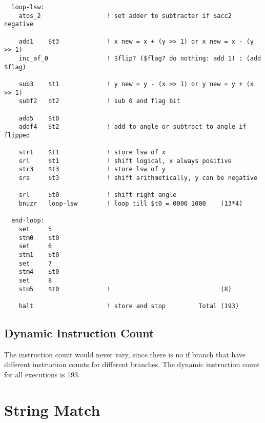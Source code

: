 \documentclass{article}
\begin{document}
\begin{lstlisting}
  loop-lsw:
    atos_2                  ! set adder to subtracter if $acc2 negative

    add1    $t3             ! x new = x + (y >> 1) or x new = x - (y >> 1)
    inc_af_0                ! $flip? ($flag? do nothing: add 1) : (add $flag)

    sub3    $t1             ! y new = y - (x >> 1) or y new = y + (x >> 1)
    subf2   $t2             ! sub 0 and flag bit

    add5    $t0
    addf4   $t2             ! add to angle or subtract to angle if flipped

    str1    $t1             ! store lsw of x
    srl     $t1             ! shift logical, x always positive
    str3    $t3             ! store lsw of y
    sra     $t3             ! shift arithmetically, y can be negative

    srl     $t0             ! shift right angle
    bnuzr   loop-lsw        ! loop till $t0 = 0000 1000    (13*4)

  end-loop:
    set     5
    stm0    $t0
    set     6
    stm1    $t0
    set     7
    stm4    $t0
    set     8
    stm5    $t0             !                              (8)

    halt                    ! store and stop         Total (193)
  \end{lstlisting}
  \subsection{Dynamic Instruction Count}
  \qquad The instruction count would never vary, since there is no if branch that have different
  instruction counts for different branches. The dynamic instruction count for all executions is 193.
  \section{String Match}
\end{document}
